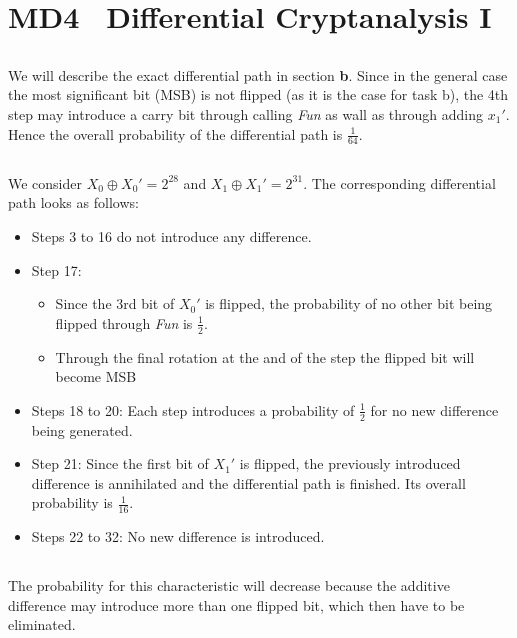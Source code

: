

\renewcommand\thesubsection{\alph{subsection})}





\section{MD4 \textendash\ Differential Cryptanalysis I}

\subsection{}
We will describe the exact differential path in section \textbf{b}. Since in the general case the most significant bit (MSB) is not flipped (as it is the case for task b), the 4th step may introduce a carry bit through calling \textit{Fun} as wall as through adding $x_1'$. Hence the overall probability of the differential path is $\frac{1}{64}$.

\subsection{}
We consider $X_0 \oplus X_0' = 2^{28}$ and $X_1 \oplus X_1' = 2^{31}$. The corresponding differential path looks as follows:
\begin{itemize}

\item Steps 3 to 16 do not introduce any difference.
\item Step 17:
\begin {itemize}
  \item Since the 3rd bit of $X_{0}'$ is flipped, the probability of no other bit being flipped through \textit{Fun} is $\frac{1}{2}$.
  \item Through the final rotation at the and of the step the flipped bit will become MSB
\end{itemize}
\item Steps 18 to 20: Each step introduces a probability of $\frac{1}{2}$ for no new difference being generated.
\item Step 21: Since the first bit of $X_1'$ is flipped, the previously introduced difference is annihilated and the differential path is finished. Its overall probability is $\frac{1}{16}$.
\item Steps 22 to 32: No new difference is introduced.
\end{itemize}

\subsection{}
The probability for this characteristic will decrease because the additive difference may introduce more than one flipped bit, which then have to be eliminated.

